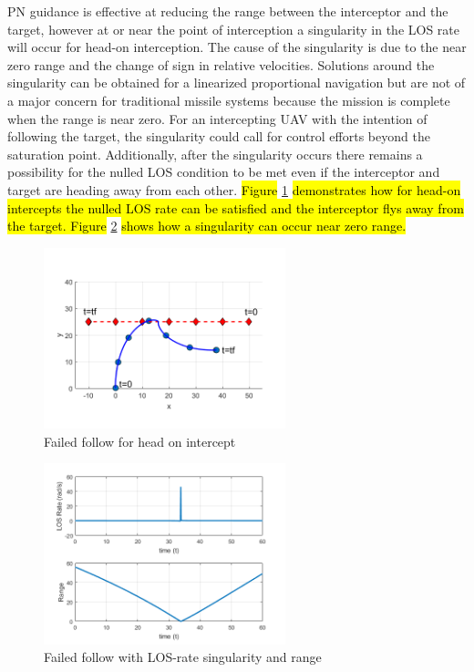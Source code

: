 \documentclass[conference]{IEEEtran}
\begin{document}
PN guidance is effective at reducing the range between the interceptor and the target, however at or near the point of interception a singularity in the LOS rate will occur for head-on interception. The cause of the singularity is due to the near zero range and the change of sign in relative velocities. Solutions around the singularity can be obtained for a linearized proportional navigation \cite{singularitySolution} but are not of a major concern for traditional missile systems because the mission is complete when the range is near zero. For an intercepting UAV with the intention of following the target, the singularity could call for control efforts beyond the saturation point. Additionally, after the singularity occurs there remains a possibility for the nulled LOS condition to be met even if the interceptor and target are heading away from each other. \hl{Figure} \ref{fig:failedIntercept} \hl{demonstrates how for head-on intercepts the nulled LOS rate can be satisfied and the interceptor flys away from the target. Figure} \ref{fig:failedInterceptLOS} \hl{shows how a singularity can occur near zero range.}





\begin{figure}[H]
	\centering
	\includegraphics[width=7cm] {x50}
	\caption{Failed follow for head on intercept}
	\label{fig:failedIntercept}
	\hspace*{0mm}
\end{figure}


\begin{figure}[H]
	\centering
	\includegraphics[width=7cm] {x50_range_LOSrate}
	\caption{Failed follow with LOS-rate singularity and range}
	\label{fig:failedInterceptLOS}
	\hspace*{0mm}
\end{figure}
\end{document}
